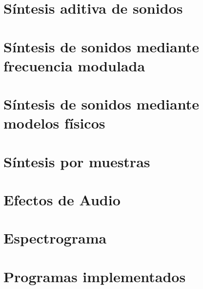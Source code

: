 







\tableofcontents
\newpage


\section{Síntesis aditiva de sonidos}
	\label{Ejercicio-2}
	

\section{Síntesis de sonidos mediante frecuencia modulada}
	\label{Ejercicio-3}
	

\section{Síntesis de sonidos mediante modelos físicos}
	\label{Ejercicio-4}
	

\section{Síntesis por muestras}
	\label{Ejercicio-5}
	

\section{Efectos de Audio}
	\label{Ejercicio-6}
	

\section{Espectrograma}
	\label{Ejercicio-7}
	

\section{Programas implementados}
	\label{Ejercicio-8}
	


